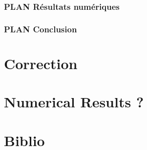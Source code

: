\documentclass[12pt]{article}
\newcommand{\tmcolor}[2]{{\color{#1}{#2}}}
\newcommand{\modif}[1]{\tmcolor{red}{#1}}
\begin{document}
	\subsubsection{PLAN Résultats numériques}
	
	\subsubsection{PLAN Conclusion}

	\newpage
	
	
	\newpage
	
	
	\newpage	
	
	
	\newpage
	\section{Correction}
	\modif{Réfléchir présenter sol considéré et domaines !}
	
	
	\newpage
	\section{Numerical Results ?}
	
	\newpage
	
	
	\newpage
	\section{Biblio}
	
\end{document}
